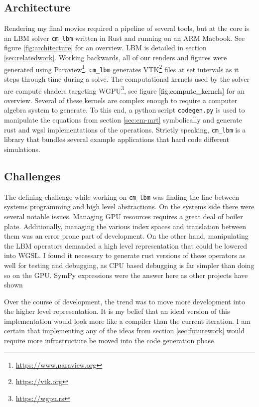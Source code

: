 \subsection{Architecture}\label{sec:architecture}

Rendering my final movies required a pipeline of several tools,
but at the core is an LBM solver \lstinline{cm_lbm} written in Rust 
and running on an ARM Macbook.
See figure \ref{fig:architecture} for an overview.
LBM is detailed in section \ref{sec:relatedwork}. 
Working backwards, all of our renders
and figures were generated using 
Paraview\footnote{\url{https://www.paraview.org}}.
\lstinline{cm_lbm} generates 
VTK\footnote{\url{https://vtk.org}} files at set intervals as it 
steps through time during a solve.
The computational kernels used by the solver are 
compute shaders targeting WGPU\footnote{\url{https://wgpu.rs}},
see figure \ref{fig:compute_kernels} for an overview.
Several of these kernels are complex enough
to require a computer algebra system to generate.
To this end, a python script \lstinline{codegen.py}
is used to manipulate the equations from section \ref{sec:cm-mrt}
symbolically and generate
rust and wgsl implementations of the operations.
Strictly speaking, \lstinline{cm_lbm} is a library 
that bundles several example applications 
that hard code different simulations.

\subsection{Challenges}
The defining challenge while working on \lstinline{cm_lbm} was finding
the line between systems programming and high level abstractions.
On the systems side there were several notable issues.
Managing GPU resources requires a great deal of boiler plate.
Additionally, managing the various index spaces and translation
between them was an error prone part of development.
On the other hand, manipulating the LBM operators
demanded a high level representation that could be lowered
into WGSL.
I found it necessary to generate rust versions of these
operators as well for testing and debugging, as 
CPU based debugging is far simpler than doing so on the GPU.
SymPy expressions were the answer here as other projects have shown

Over the course of development, the trend was to move
more development into the higher level representation.
It is my belief that an ideal version of this implementation would
look more like a compiler than the current iteration.
I am certain that implementing any of the ideas from 
section \ref{sec:futurework}
would require more infrastructure be moved into the 
code generation phase.

